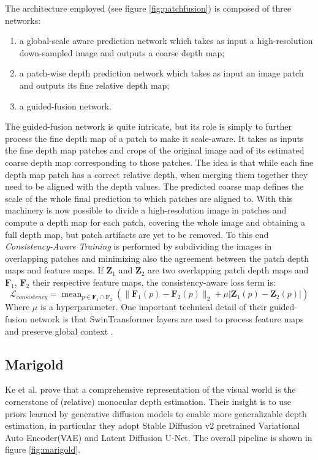 The architecture employed (see figure \ref{fig:patchfusion}) is composed of three networks:
\begin{enumerate}
	\item{a global-scale aware prediction network which takes as input a high-resolution down-sampled image and outputs a coarse depth map;}
	\item{a patch-wise depth prediction network which takes as input an image patch and outputs its fine relative depth map;}
	\item{a guided-fusion network.}
\end{enumerate}
The guided-fusion network is quite intricate, but its role is simply to further process the fine depth map of a patch to make it scale-aware.
It takes as inputs the fine depth map patches and crops of the original image and of its estimated coarse depth map corresponding to those patches.
The idea is that while each fine depth map patch has a correct relative depth, when merging them together they need to be aligned with the depth values.
The predicted coarse map defines the scale of the whole final prediction to which patches are aligned to.
With this machinery is now possible to divide a high-resolution image in patches and compute a depth map for each patch, covering the whole image and obtaining a full depth map, but patch artifacts are yet to be removed.
To this end \textit{Consistency-Aware Training} is performed by subdividing the images in overlapping patches and minimizing also the agreement between the patch depth maps and feature maps.
If $\mathbf{Z}_{1}$ and $\mathbf{Z}_{2}$ are two overlapping patch depth maps and $\mathbf{F}_{1}$, $\mathbf{F}_{2}$ their respective feature maps, the consistency-aware loss term is:
\[
	\mathcal{L}_{consistency} =
		\mathop{\text{mean}}_{p \in \mathbf{F}_{1} \cap \mathbf{F}_{2}}
		\left(
			\big\| \mathbf{F}_{1}(p) - \mathbf{F}_{2}(p) \big\|_{2} + \mu \big| \mathbf{Z}_{1}(p) - \mathbf{Z}_{2}(p) \big|
		\right)
\]
Where $\mu$ is a hyperparameter.
One important technical detail of their guided-fusion network is that SwinTransformer layers \cite{swin} are used to process feature maps and preserve global context \cite{PatchFusion}.

\subsection{Marigold}
Ke et al. \cite{Marigold} prove that a comprehensive representation of the visual world is the cornerstone of (relative) monocular depth estimation.
Their insight is to use priors learned by generative diffusion models to enable more generalizable depth estimation, in particular they adopt Stable Diffusion v2 \cite{StableDiffusionV2} pretrained Variational Auto Encoder(VAE) and Latent Diffusion U-Net.
The overall pipeline is shown in figure \ref{fig:marigold}.

